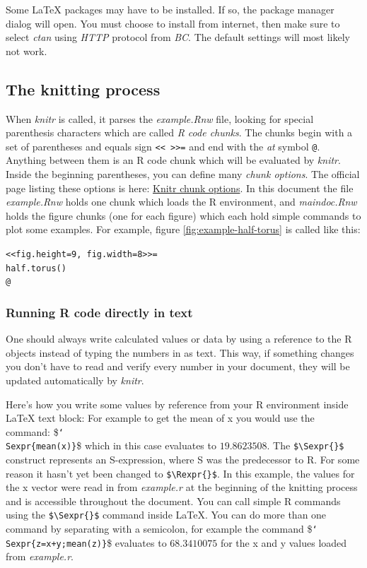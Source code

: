 \documentclass[11pt]{book}\usepackage[]{graphicx}\usepackage[]{color}
\newcommand{\rnwexamplefile}{example.Rnw}
\newcommand{\rnwmaindocfile}{maindoc.Rnw}
\newcommand{\latex}{\LaTeX\xspace}
\newcommand{\ShowSexpr}[1]{\texttt{{\char`\\}Sexpr\{#1\}}}
\begin{document}
Some \latex packages may have to be installed. If so, the package manager dialog will open. You must choose to install from internet, then make sure to select \emph{ctan} using \emph{HTTP} protocol from \emph{BC}. The default settings will most likely not work.

\subsection{The knitting process}

When \emph{knitr} is called, it parses the \emph{\rnwexamplefile} file, looking for special parenthesis characters which are called \emph{R code chunks}. The chunks begin with a set of parentheses and equals sign \verb!<< >>=! and end with the \emph{at} symbol \verb!@!. Anything between them is an R code chunk which will be evaluated by \emph{knitr}. Inside the beginning parentheses, you can define many \emph{chunk options}. The official page listing these options is here: \href{http://yihui.name/knitr/options/}{Knitr chunk options}. In this document the file \emph{\rnwexamplefile} holds one chunk which loads the R environment, and \emph{\rnwmaindocfile} holds the figure chunks (one for each figure) which each hold simple commands to plot some examples. For example, figure \ref{fig:example-half-torus} is called like this:

\verb!<<fig.height=9, fig.width=8>>=! \\
\verb!half.torus()! \\
\verb!@!

\subsubsection{Running R code directly in text}
One should always write calculated values or data by using a reference to the R objects instead of typing the numbers in as text. This way, if something changes you don't have to read and verify every number in your document, they will be updated automatically by \emph{knitr}.

Here's how you write some values by reference from your R environment inside \latex text block: For example to get the mean of x you would use the command: \$\ShowSexpr{mean(x)}\$ which in this case evaluates to $19.8623508$. The \verb!$\Sexpr{}$! construct represents an S-expression, where S was the predecessor to R. For some reason it hasn't yet been changed to \verb!$\Rexpr{}$!. In this example, the values for the x vector were read in from \emph{example.r} at the beginning of the knitting process and is accessible throughout the document. You can call simple R commands using the \verb!$\Sexpr{}$! command inside \latex. You can do more than one command by separating with a semicolon, for example the command \$\ShowSexpr{z=x+y;mean(z)}\$ evaluates to $68.3410075$ for the x and y values loaded from \emph{example.r}.\\
\end{document}
